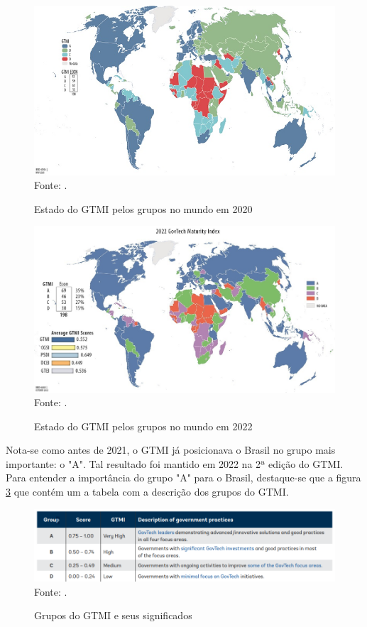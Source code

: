 \begin{figure}[H]
	\centering
	\caption{Estado do GTMI pelos grupos no mundo em 2020}
	\includegraphics[width=1\linewidth]{figuras/gtmi_2020_survey_map}
	\label{fig:gtmi_2020_survey_map}
	\footnotesize{Fonte: \cite{gtmi_2020_findings}.}
\end{figure}

\begin{figure}[H]
	\centering
	\caption{Estado do GTMI pelos grupos no mundo em 2022}
	\includegraphics[width=1\linewidth]{figuras/gtmi_2022_survey_map}
	\label{fig:gtmi_2022_survey_map}
	\footnotesize{Fonte: \cite{gtmi_2022}.}
\end{figure}

Nota-se como antes de 2021, o GTMI já posicionava o Brasil no grupo mais importante: o "A". Tal resultado foi mantido em 2022 na 2ª edição do GTMI. Para entender a importância do grupo "A" para o Brasil, destaque-se que a figura \ref{fig:definicao_grupos_gtmi} que contém um a tabela com a descrição dos grupos do GTMI.

\begin{figure}[H]
	\centering
	\caption{Grupos do GTMI e seus significados}
	\includegraphics[width=1\linewidth]{figuras/definicao_grupos_gtmi}
	\label{fig:definicao_grupos_gtmi}
	\footnotesize{Fonte: \cite{gtmi_2022}.}
\end{figure}


